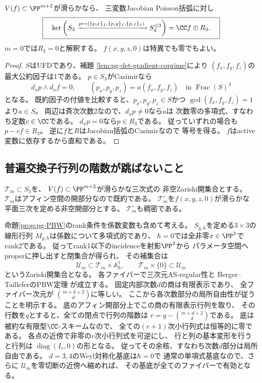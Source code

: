 \begin{lemma}[全三次式の古典的Casimir核]
\label{lem:pg-det-classical-kernel}
$V(f)\subset\PP^{m+2}$が滑らかなら、
三変数Jacobian Poisson括弧に対し
\begin{equation}
 \boxed{\quad
 \ker\left(S_3\xrightarrow{p\mapsto
 (\{p,x\}_f,\{p,y\}_f,\{p,z\}_f)}
 S_4^{\oplus3}\right)
 =\CC f\oplus R_3.
 \quad}
 \label{eq:pg-det-classical-kernel}
\end{equation}
$m=0$では$R_3=0$と解釈する。
$f(x,y,z,0)$は特異でも零でもよい。
\end{lemma}
\begin{proof}
$S$はUFDであり、補題
\ref{lem:pg-det-gradient-coprime}により
$(f_x,f_y,f_z)$の最大公約因子は1である。
$p\in S_3$がCasimirなら
\begin{equation}
 d_xp\wedge d_xf=0,
 \qquad
 (p_x,p_y,p_z)=a(f_x,f_y,f_z)
 \quad\text{in }\operatorname{Frac}(S)^3
 \label{eq:pg-det-casimir-proportional}
\end{equation}
となる。
既約因子の付値を比較すると、$p_x,p_y,p_z\in S$かつ
$\gcd(f_x,f_y,f_z)=1$より$a\in S$。
両辺は斉次次数2なので、$d_xp\ne0$なら$a$は
次数零の多項式、すなわち定数$c\in\CC$である。
$d_xp=0$なら$p\in R_3$である。
従っていずれの場合も$p-cf\in R_3$。
逆に$f$と$R$はJacobian括弧のCasimirなので
等号を得る。
$f$はactive変数に依存するから直和である。
\end{proof}

\subsection{普遍交換子行列の階数が跳ばないこと}
$\mathcal T_m\subset S_3$を、
$V(f)\subset\PP^{m+2}$が滑らかな三次式の
非空Zariski開集合とする。
$\mathcal T_m$はアフィン空間の開部分なので既約である。
$\mathcal T_m^\circ$を$f(x,y,z,0)$が滑らかな
平面三次を定める非空開部分とする。
$\mathcal T_m^\circ$も稠密である。

命題\ref{prop:pg-PBW}のrank条件を係数変数も含めて考える。
$S_{g,\hbar}$を定める$3\times3$の線形行列
$M_{g,\hbar}$は係数について多項式的であり、
$\hbar=0$では全非零$x\in\PP^2$でrank2である。
従ってrank1以下のincidenceを射影$\PP^2$から
パラメータ空間へproperに押し出すと閉集合が得られ、
その補集合は
\begin{equation}
 \mathcal U_m\subset\mathcal T_m\times\mathbb A^1_\hbar,
 \qquad
 \mathcal T_m\times\{0\}\subset\mathcal U_m
 \label{eq:pg-det-universal-open}
\end{equation}
というZariski開集合となる。
各ファイバーで三次元AS-regular性と
Berger--TailleferのPBW定理
\cite{PMoriSmith,PBergerTaillefer}が成立する。
固定内部次数$d$の商は有限表示であり、
全ファイバー次元が
$\binom{m+d+2}{d}$に等しい。
ここから各次数部分の局所自由性が従うことを明示する。
底のアフィン開部分上でこの商の有限表示行列を取り、
その行数を$q$とすると、全ての閉点で行列の階数は
$r=q-\binom{m+d+2}{d}$である。
底は被約な有限型$\CC$-スキームなので、
全ての$(r+1)$次小行列式は恒等的に零である。
各点の近傍で非零の$r$次小行列式を可逆にし、
行と列の基本変形を行うと行列は
$\operatorname{diag}(I_r,0)$の形となる。
従ってその余核、すなわち次数$d$部分は局所自由である。
$d=3,4$のWeyl対称化基底は$\hbar=0$で
通常の単項式基底なので、さらに
$\mathcal U_m$を零切断の近傍へ縮めれば、
その基底が全てのファイバーで有効となる。

